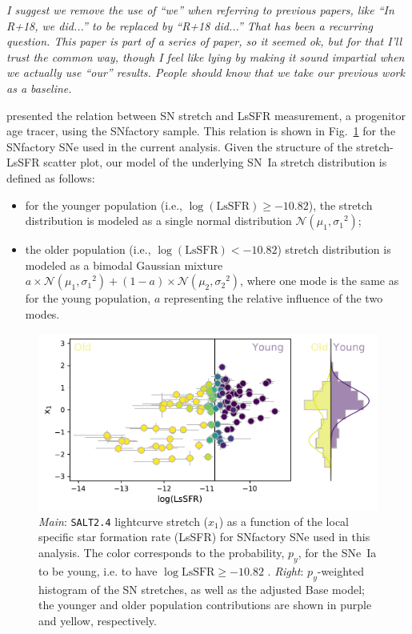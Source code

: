 \documentclass[]{aa} %
\newcommand{\nn}[1]{{\textcolor[rgb]{0.25, 0.50, 0}{#1}}}
\newcommand{\yc}[1]{{\textcolor{BrickRed}{#1}}}
\begin{document}
\yc{\textit{I suggest we remove the use of ``we'' when referring to previous papers,
like ``In R+18, we did...'' to be replaced by ``R+18 did...''}} \nn{\textit{That
has been a recurring question. This paper is part of a series of paper, so it
seemed ok, but for that I'll trust the common way, though I feel like lying by
making it sound impartial when we actually use ``our'' results. People should
know that we take our previous work as a baseline.}}

\cite{rigault2018} presented the relation between SN stretch and LsSFR
measurement, a progenitor age tracer, using the SNfactory sample. This relation
is shown in Fig.~\ref{fig:stretchlssfr} for the SNfactory SNe used in the
current analysis. Given the structure of the stretch-LsSFR scatter plot, our
model of the underlying SN~Ia stretch distribution is defined as follows:

\begin{itemize}
    \item for the younger population (i.e., $\log(\mathrm{LsSFR})\geq-10.82$),
        the stretch distribution is modeled as a single normal distribution
        $\mathcal{N}(\mu_1, \sigma_1{}^2)$; 
    \item the older population (i.e., $\log( \mathrm{LsSFR})<-10.82$) stretch
        distribution is modeled as a bimodal Gaussian mixture $a\times
        \mathcal{N}(\mu_1, \sigma_1{}^2) + (1-a)\times \mathcal{N}(\mu_2,
        \sigma_2{}^2)$, where one mode is the same as for the young population,
        $a$ representing the relative influence of the two modes.
\end{itemize}

\begin{figure}
    \centering
    \includegraphics[width=0.8\linewidth]{Article_figures/model_base_hist.pdf}
    \caption{\textit{Main}: \textsc{\texttt{SALT2.4}} lightcurve stretch ($x_1$)
        as a function of the local specific star formation rate (LsSFR) for
        SNfactory SNe used in this analysis. The color corresponds to the
        probability, $p_y$, for the SNe~Ia to be young, i.e. to have
        $\log\mathrm{LsSFR} \geq -10.82$ \citep[see][]{rigault2018}.
        \textit{Right}: $p_y$-weighted histogram of the SN stretches, as well as
        the adjusted Base model; the younger and older population contributions
        are shown in purple and yellow, respectively.}
    \label{fig:stretchlssfr}
\end{figure}
\end{document}
